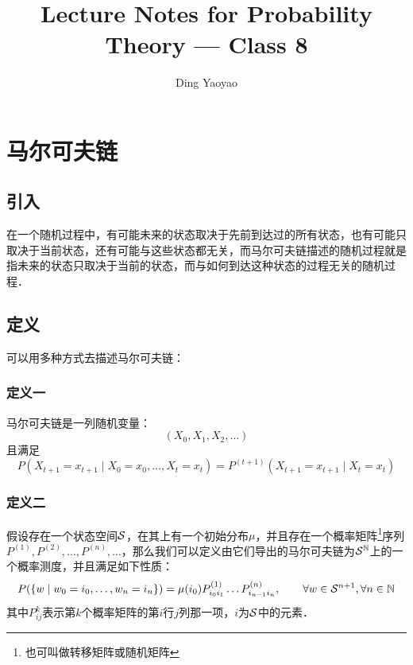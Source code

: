 

\title{Lecture Notes for Probability Theory --- Class 8}
\author{Ding Yaoyao}
\date{}


\maketitle
\tableofcontents

\newpage

\section{马尔可夫链}
	\subsection{引入}
		在一个随机过程中，有可能未来的状态取决于先前到达过的所有状态，也有可能只取决于当前状态，还有可能与这些状态都无关，而马尔可夫链描述的随机过程就是指未来的状态只取决于当前的状态，而与如何到达这种状态的过程无关的随机过程．
	\subsection{定义}
		可以用多种方式去描述马尔可夫链：
		\subsubsection{定义一} 
		马尔可夫链是一列随机变量：
		$$
			(X_0, X_1, X_2, \dots)
		$$
		且满足
		$$
			P(X_{t+1}=x_{t+1} \mid X_0=x_0,\dots,X_t=x_t) = P^{(t+1)}(X_{t+1}=x_{t+1}\mid X_t=x_t)
		$$
		\subsubsection{定义二}
		假设存在一个状态空间$\cal S$，在其上有一个初始分布$\mu$，并且存在一个概率矩阵\footnote{也可叫做转移矩阵或随机矩阵}序列
		$P^{(1)}, P^{(2)}, \dots, P^{(n)}, \dots$，那么我们可以定义由它们导出的马尔可夫链为${\cal S}^{\mathbb{N}}$上的一个概率测度，并且满足如下性质：
		$$
			P(\{w \mid w_0=i_0,\dots,w_n=i_n \}) = \mu(i_0)P_{i_0i_1}^{(1)}\dots P_{i_{n-1}i_n}^{(n)}, \quad \quad \forall  w \in {\cal S}^{n+1}, \forall n \in \mathbb{N}
		$$
		其中$P_{ij}^{k}$表示第$k$个概率矩阵的第$i$行$j$列那一项，$i$为$\cal S$中的元素．
		
